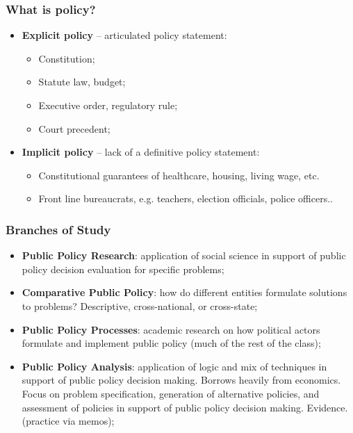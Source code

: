 \documentclass[aspectratio=169]{beamer}
\theoremstyle{principle}
\begin{document}
\begin{frame}
\frametitle{What is policy?}

\begin{itemize}
\item \textbf{Explicit policy} -- articulated policy statement:
\begin{itemize}
\item Constitution;
\item Statute law, budget;
\item Executive order, regulatory rule;
\item Court precedent;
\end{itemize}
\bigskip
\bigskip
\item \textbf{Implicit policy} -- lack of a definitive policy statement:
\begin{itemize}
\item Constitutional guarantees of healthcare, housing, living wage, etc.
\item Front line bureaucrats, e.g. teachers, election officials, police officers..
\end{itemize}

\end{itemize}
\end{frame}

\begin{frame}
\frametitle{Branches of Study}

\begin{itemize}
\item \textbf{Public Policy Research}: application of social science in support of public policy decision evaluation for specific problems;
\bigskip
\bigskip

\item \textbf{Comparative Public Policy}: how do different entities formulate solutions to problems? Descriptive, cross-national, or cross-state;
\bigskip
\bigskip

\item \textbf{Public Policy Processes}: academic research on how political actors formulate and implement public policy (much of the rest of the class);
\bigskip
\bigskip

\item \textbf{Public Policy Analysis}: application of logic and mix of techniques in support of public policy decision making.  Borrows heavily from economics. Focus on problem specification, generation of alternative policies, and assessment of policies in support of public policy decision making.  Evidence. (practice via memos);

\end{itemize}
\end{frame}
\end{document}
